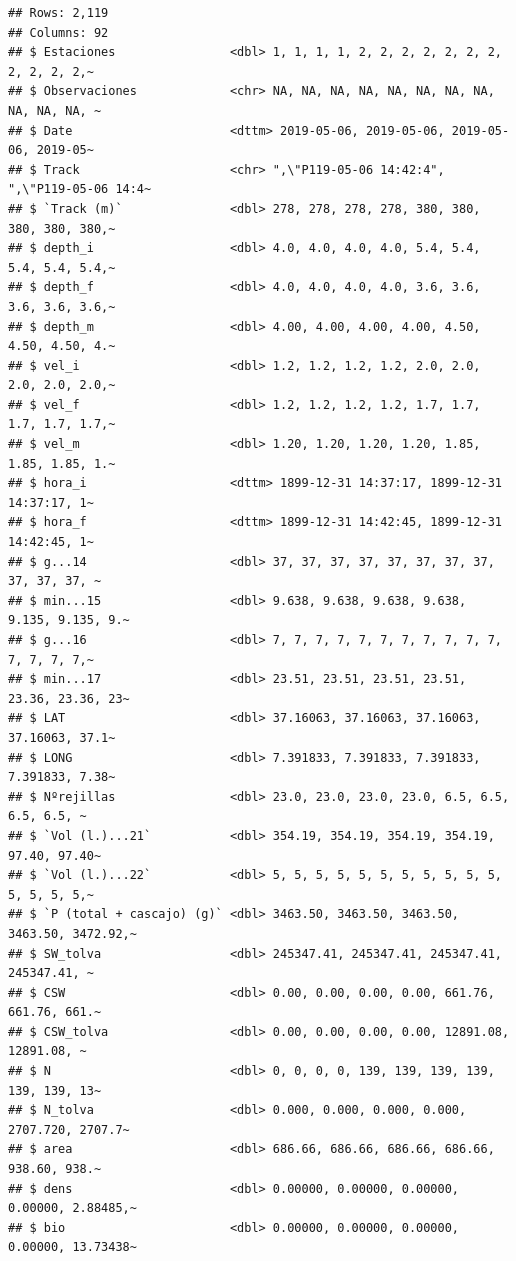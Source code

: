 \documentclass[
]{article}
\begin{document}
\begin{verbatim}
## Rows: 2,119
## Columns: 92
## $ Estaciones                <dbl> 1, 1, 1, 1, 2, 2, 2, 2, 2, 2, 2, 2, 2, 2, 2,~
## $ Observaciones             <chr> NA, NA, NA, NA, NA, NA, NA, NA, NA, NA, NA, ~
## $ Date                      <dttm> 2019-05-06, 2019-05-06, 2019-05-06, 2019-05~
## $ Track                     <chr> ",\"P119-05-06 14:42:4", ",\"P119-05-06 14:4~
## $ `Track (m)`               <dbl> 278, 278, 278, 278, 380, 380, 380, 380, 380,~
## $ depth_i                   <dbl> 4.0, 4.0, 4.0, 4.0, 5.4, 5.4, 5.4, 5.4, 5.4,~
## $ depth_f                   <dbl> 4.0, 4.0, 4.0, 4.0, 3.6, 3.6, 3.6, 3.6, 3.6,~
## $ depth_m                   <dbl> 4.00, 4.00, 4.00, 4.00, 4.50, 4.50, 4.50, 4.~
## $ vel_i                     <dbl> 1.2, 1.2, 1.2, 1.2, 2.0, 2.0, 2.0, 2.0, 2.0,~
## $ vel_f                     <dbl> 1.2, 1.2, 1.2, 1.2, 1.7, 1.7, 1.7, 1.7, 1.7,~
## $ vel_m                     <dbl> 1.20, 1.20, 1.20, 1.20, 1.85, 1.85, 1.85, 1.~
## $ hora_i                    <dttm> 1899-12-31 14:37:17, 1899-12-31 14:37:17, 1~
## $ hora_f                    <dttm> 1899-12-31 14:42:45, 1899-12-31 14:42:45, 1~
## $ g...14                    <dbl> 37, 37, 37, 37, 37, 37, 37, 37, 37, 37, 37, ~
## $ min...15                  <dbl> 9.638, 9.638, 9.638, 9.638, 9.135, 9.135, 9.~
## $ g...16                    <dbl> 7, 7, 7, 7, 7, 7, 7, 7, 7, 7, 7, 7, 7, 7, 7,~
## $ min...17                  <dbl> 23.51, 23.51, 23.51, 23.51, 23.36, 23.36, 23~
## $ LAT                       <dbl> 37.16063, 37.16063, 37.16063, 37.16063, 37.1~
## $ LONG                      <dbl> 7.391833, 7.391833, 7.391833, 7.391833, 7.38~
## $ Nºrejillas                <dbl> 23.0, 23.0, 23.0, 23.0, 6.5, 6.5, 6.5, 6.5, ~
## $ `Vol (l.)...21`           <dbl> 354.19, 354.19, 354.19, 354.19, 97.40, 97.40~
## $ `Vol (l.)...22`           <dbl> 5, 5, 5, 5, 5, 5, 5, 5, 5, 5, 5, 5, 5, 5, 5,~
## $ `P (total + cascajo) (g)` <dbl> 3463.50, 3463.50, 3463.50, 3463.50, 3472.92,~
## $ SW_tolva                  <dbl> 245347.41, 245347.41, 245347.41, 245347.41, ~
## $ CSW                       <dbl> 0.00, 0.00, 0.00, 0.00, 661.76, 661.76, 661.~
## $ CSW_tolva                 <dbl> 0.00, 0.00, 0.00, 0.00, 12891.08, 12891.08, ~
## $ N                         <dbl> 0, 0, 0, 0, 139, 139, 139, 139, 139, 139, 13~
## $ N_tolva                   <dbl> 0.000, 0.000, 0.000, 0.000, 2707.720, 2707.7~
## $ area                      <dbl> 686.66, 686.66, 686.66, 686.66, 938.60, 938.~
## $ dens                      <dbl> 0.00000, 0.00000, 0.00000, 0.00000, 2.88485,~
## $ bio                       <dbl> 0.00000, 0.00000, 0.00000, 0.00000, 13.73438~

\end{verbatim}
\end{document}
